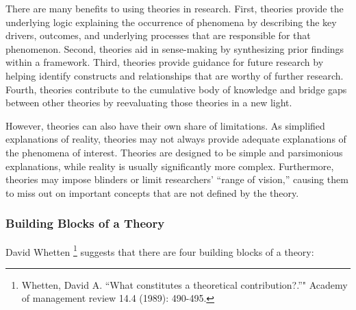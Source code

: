 \documentclass[]{book}
\let\rmarkdownfootnote\footnote%
\def\footnote{\protect\rmarkdownfootnote}
\theoremstyle{definition}
\theoremstyle{definition}
\theoremstyle{definition}
\theoremstyle{remark}
\begin{document}
There are many benefits to using theories in research. First, theories
provide the underlying logic explaining the occurrence of phenomena by
describing the key drivers, outcomes, and underlying processes that are
responsible for that phenomenon. Second, theories aid in sense-making by
synthesizing prior findings within a framework. Third, theories provide
guidance for future research by helping identify constructs and
relationships that are worthy of further research. Fourth, theories
contribute to the cumulative body of knowledge and bridge gaps between
other theories by reevaluating those theories in a new light.

However, theories can also have their own share of limitations. As
simplified explanations of reality, theories may not always provide
adequate explanations of the phenomena of interest. Theories are
designed to be simple and parsimonious explanations, while reality is
usually significantly more complex. Furthermore, theories may impose
blinders or limit researchers' ``range of vision,'' causing them to miss
out on important concepts that are not defined by the theory.

\hypertarget{building-blocks-of-a-theory}{%
\subsubsection{Building Blocks of a
Theory}\label{building-blocks-of-a-theory}}

David Whetten \footnote{Whetten, David A. ``What constitutes a
  theoretical contribution?.''" Academy of management review 14.4
  (1989): 490-495.} suggests that there are four building blocks of a
theory:
\end{document}
